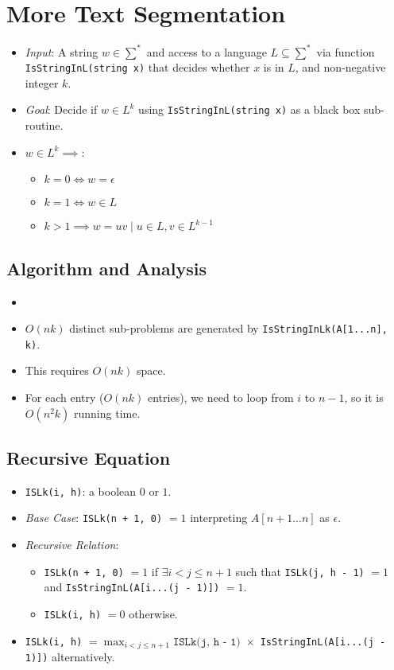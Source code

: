 
\section{More Text Segmentation}
\begin{itemize}
    \item \textit{Input}: A string $w \in \sum^{\ast}$ and access to a language $L \subseteq \sum^{\ast}$ via function \texttt{IsStringInL(string x)} that decides whether $x$ is in $L$, and non-negative integer $k$.
    \item \textit{Goal}: Decide if $w \in L^k$ using \texttt{IsStringInL(string x)} as a black box sub-routine.
    \item $w \in L^k \implies$:
    \begin{itemize}
        \item $k = 0 \iff w = \epsilon$
        \item $k = 1 \iff w \in L$
        \item $k > 1 \implies w = uv \mid  u \in L, v \in L^{k - 1}$
    \end{itemize}
\end{itemize}

\subsection{Algorithm and Analysis}
\begin{itemize}
    \item[] 
    \item $O(nk)$ distinct sub-problems are generated by \texttt{IsStringInLk(A[1...n], k)}.
    \item This requires $O(nk)$ space.
    \item For each entry ($O(nk)$ entries), we need to loop from $i$ to $n - 1$, so it is $O(n^2k)$ running time.
\end{itemize}

\subsection{Recursive Equation}
\begin{itemize}
    \item \texttt{ISLk(i, h)}: a boolean $0$ or $1$.
    \item \textit{Base Case}: \texttt{ISLk(n + 1, 0)} $= 1$ interpreting $A[n + 1...n]$ as $\epsilon$.
    \item \textit{Recursive Relation}:
    \begin{itemize}
        \item \texttt{ISLk(n + 1, 0)} $= 1$ if $\exists i < j \leq n + 1$ such that \texttt{ISLk(j, h - 1)} $= 1$ and \texttt{IsStringInL(A[i...(j - 1)])} $= 1$.
        \item \texttt{ISLk(i, h)} $= 0$ otherwise.
    \end{itemize}
    \item \texttt{ISLk(i, h)} $= \max_{i < j \leq n + 1}\texttt{ISLk(j, h - 1) }\times$ \texttt{IsStringInL(A[i...(j - 1)])} alternatively.
\end{itemize}

